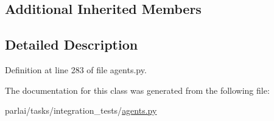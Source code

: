 \subsection*{Additional Inherited Members}


\subsection{Detailed Description}


Definition at line 283 of file agents.\+py.



The documentation for this class was generated from the following file\+:\begin{DoxyCompactItemize}
\item 
parlai/tasks/integration\+\_\+tests/\hyperlink{parlai_2tasks_2integration__tests_2agents_8py}{agents.\+py}\end{DoxyCompactItemize}
